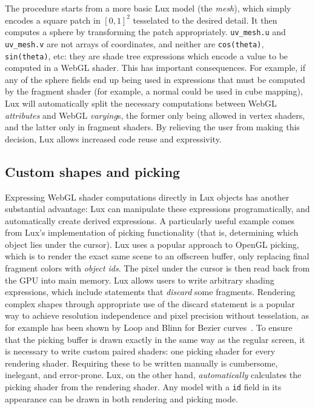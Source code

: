 The procedure starts from a more basic Lux model (the \emph{mesh}),
which simply encodes a square patch in $[0,1]^2$ tesselated to the
desired detail. It then computes a sphere by transforming the patch
appropriately. \texttt{uv\_mesh.u} and \texttt{uv\_mesh.v} are not
arrays of coordinates, and neither are \texttt{cos(theta)},
\texttt{sin(theta)}, etc: they are shade tree expressions which encode
a value to be computed in a WebGL shader. This has important
consequences. For example, if any of the sphere fields end up being
used in expressions that must be computed by the fragment shader (for
example, a normal could be used in cube mapping), Lux will
automatically split the necessary computations between WebGL
\emph{attributes} and WebGL \emph{varying}s, the former only being
allowed in vertex shaders, and the latter only in fragment shaders. By
relieving the user from making this decision, Lux allows increased
code reuse and expressivity.

\subsection{Custom shapes and picking}

Expressing WebGL shader computations directly in Lux objects has
another substantial advantage: Lux can manipulate these expressions
programatically, and automatically create derived expressions. A
particularly useful example comes from Lux's implementation of
picking functionality (that is, determining which object lies under
the cursor). Lux uses a popular approach to OpenGL picking, which is
to render the exact same scene to an offscreen buffer, only replacing
final fragment colors with \emph{object ids}. The pixel under the
cursor is then read back from the GPU into main memory.
%
Lux allows
users to write arbitrary shading expressions, which include
statements that \emph{discard} some fragments. Rendering complex shapes through appropriate use of the
discard statement is a popular way to achieve resolution
independence and pixel precision without tesselation, as for example
has been shown by Loop and Blinn for Bezier
curves~\cite{Loop:2005:RIC}.
%
To ensure that the picking buffer is drawn exactly in the
same way as the regular screen, it is necessary to write custom
paired shaders: one picking shader for every rendering
shader. Requiring these to be written manually is cumbersome,
inelegant, and error-prone. Lux, on the other hand,
\emph{automatically} calculates the picking shader from the rendering
shader. Any model with a \texttt{id} field in its appearance can be
drawn in both rendering and picking mode. 

